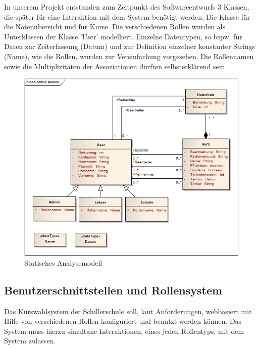 In unserem Projekt entstanden zum Zeitpunkt des Softwareentwurfs 3 Klassen, die später für eine Interaktion mit dem System benötigt werden. Die Klasse für die Notenübersicht und für Kurse. Die verschiedenen Rollen wurden als Unterklassen der Klasse 'User' modelliert. Einzelne Datentypen, so bspw. für Daten zur Zeiterfassung (Datum) und zur Definition einzelner konstanter Strings (Name), wie die Rollen, wurden zur Vereinfachung vorgesehen.
Die Rollennamen sowie die Multiplizitäten der Assoziationen dürften selbsterklärend sein.

\begin{figure}[H]
 \begin{center}
   \includegraphics[scale=0.7]{img/StaticClassModel_kuwasys20.png}
 \end{center}
 \caption[\textbf{Statisches Analysemodell}]{Statisches Analysemodell}
 \label{fig:UML_SA_kuwasys20}
\end{figure}

\subsection{Benutzerschnittstellen und Rollensystem}\label{subsec:Benutzerschnittstellen und Rollensystem}

Das Kurswahlsystem der Schillerschule soll, laut Anforderungen, webbasiert mit Hilfe von verschiedenen Rollen konfiguriert und benutzt werden können.
Das System muss hierzu simultane Interaktionen, eines jeden Rollentyps, mit dem System zulassen. 

